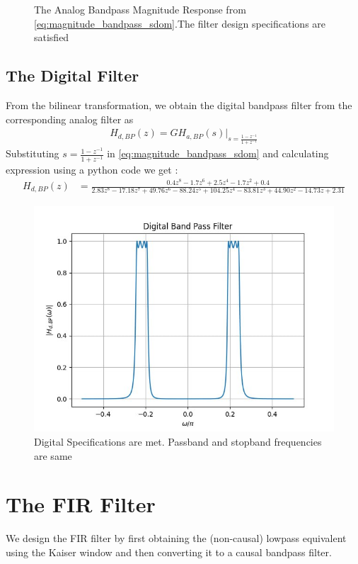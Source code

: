 \documentclass{article}
\begin{document}
\begin{enumerate}
\begin{figure}[H]
  \caption{The Analog Bandpass Magnitude Response from \eqref{eq:magnitude_bandpass_sdom}.The filter design specifications are satisfied}
  \label{fig:band_pass_filter}
 \end{figure}
\end{enumerate}

\subsection{The Digital Filter}
From the bilinear transformation, we obtain the digital bandpass filter from the corresponding analog filter as
\begin{align}
    H_{d,BP}(z) = GH_{a,BP}(s)\vert_{s = \frac{1-z^{-1}}{1 + z^{-1}}}
\end{align}
Substituting $s=\frac{1-z^{-1}}{1+z^{-1}}$ in \eqref{eq:magnitude_bandpass_sdom} and calculating expression using a python code we get :
\begin{align}
    H_{d,BP}(z) & = \frac{0.4z^8 - 1.7z^6 + 2.5z^4 - 1.7z^2 + 0.4}{2.83z^8 - 17.18z^7 + 49.76z^6 - 88.24z^5 + 104.25z^4 - 83.81z^3 + 44.90z^2 - 14.73z + 2.31}
\end{align}


\begin{figure}[H]
    \centering
    \includegraphics[width=1\columnwidth]{figs/Digital_BPF.png}
    \caption{Digital Specifications are met. Passband and stopband frequencies are same}
    \label{fig:Digital_BPF}
\end{figure}

\section{The FIR Filter}
We design the FIR filter by first obtaining the (non-causal) lowpass equivalent using the Kaiser window
and then
converting it to a causal bandpass filter.
\end{document}
